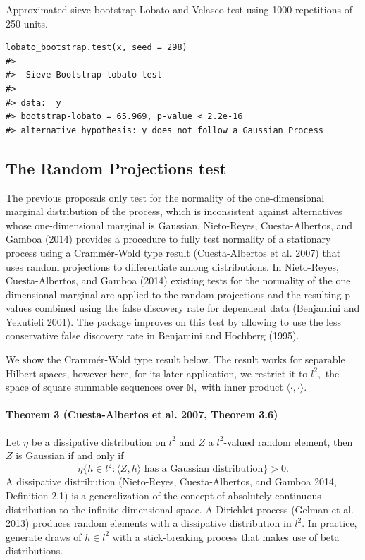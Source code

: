 Approximated sieve bootstrap Lobato and Velasco test using 1000 repetitions of 250 units.

\begin{verbatim}
lobato_bootstrap.test(x, seed = 298)
#> 
#>  Sieve-Bootstrap lobato test
#> 
#> data:  y
#> bootstrap-lobato = 65.969, p-value < 2.2e-16
#> alternative hypothesis: y does not follow a Gaussian Process
\end{verbatim}

\hypertarget{the-random-projections-test}{%
\subsection{The Random Projections test}\label{the-random-projections-test}}

The previous proposals only test for the normality of the one-dimensional marginal distribution of the process, which is inconsistent against alternatives whose one-dimensional marginal is Gaussian. Nieto-Reyes, Cuesta-Albertos, and Gamboa (2014) provides a procedure to fully test normality of a stationary process using a Crammér-Wold type result (Cuesta-Albertos et al. 2007) that uses random projections to differentiate among distributions. In Nieto-Reyes, Cuesta-Albertos, and Gamboa (2014) existing tests for the normality of the one dimensional marginal are applied to the random projections and the resulting p-values combined using the false discovery rate for dependent data (Benjamini and Yekutieli 2001). The  package improves on this test by allowing to use the less conservative false discovery rate in Benjamini and Hochberg (1995).

We show the Crammér-Wold type result below. The result works for separable Hilbert spaces, however here, for its later application, we restrict it to \(l^2,\) the space of square summable sequences over \(\mathbb{N},\) with inner product \(\langle \cdot,\cdot \rangle.\)

\hypertarget{theorem-3-cuesta2007-theorem-3.6}{%
\paragraph{Theorem 3 (Cuesta-Albertos et al. 2007, Theorem 3.6)}\label{theorem-3-cuesta2007-theorem-3.6}}

Let \(\eta\) be a dissipative distribution on \(l^2\) and \(Z\) a \(l^2\)-valued random element, then \(Z\) is Gaussian if and only if
\[
 \eta\{h \in l^2: \langle Z,h \rangle \text{ has a Gaussian distribution}\} > 0.
\]
A dissipative distribution (Nieto-Reyes, Cuesta-Albertos, and Gamboa 2014, Definition 2.1) is a generalization of the concept of absolutely continuous distribution to the infinite-dimensional space. A Dirichlet process (Gelman et al. 2013) produces random elements with a dissipative distribution in \(l^2\). In practice, generate draws of \(h \in l^2\) with a stick-breaking process that makes use of beta distributions.

